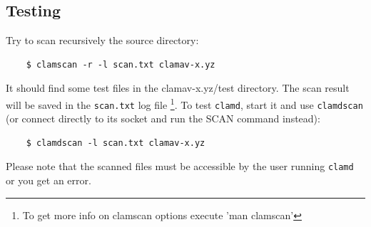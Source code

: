 \documentclass[a4paper,titlepage,12pt]{article}
\begin{document}
    \subsection{Testing}
    Try to scan recursively the source directory:
    \begin{verbatim}
	$ clamscan -r -l scan.txt clamav-x.yz
    \end{verbatim}
    It should find some test files in the clamav-x.yz/test directory.
    The scan result will be saved in the \verb+scan.txt+ log file
    \footnote{To get more info on clamscan options execute 'man clamscan'}.
    To test \verb+clamd+, start it and use \verb+clamdscan+ (or connect directly
    to its socket and run the SCAN command instead):
    \begin{verbatim}
	$ clamdscan -l scan.txt clamav-x.yz
    \end{verbatim}
    Please note that the scanned files must be accessible by the user running
    \verb+clamd+ or you get an error.
\end{document}
